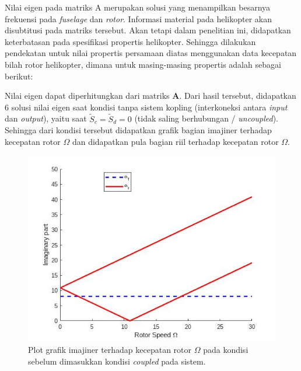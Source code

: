 Nilai eigen pada matriks A merupakan solusi yang menampilkan besarnya frekuensi pada \textit{fuselage} dan \textit{rotor}. Informasi material pada helikopter akan disubtitusi pada matriks tersebut. Akan tetapi dalam penelitian ini, didapatkan keterbatasan pada spesifikasi propertis helikopter. Sehingga dilakukan pendekatan untuk nilai propertis persamaan diatas menggunakan data kecepatan bilah rotor helikopter, dimana untuk masing-masing propertis adalah sebagai berikut:

\begin{table}[h]
	\centering
	\caption{Pendekatan nilai propertis helikopter.}
	\label{tb:propertis}
\end{table}

Nilai eigen dapat diperhitungkan dari matriks $\mathbf{A}$. Dari hasil tersebut, didapatkan 6 solusi nilai eigen saat kondisi tanpa sistem kopling (interkoneksi antara \textit{input} dan \textit{output}), yaitu saat $\tilde{S}_c = \tilde{S}_d = 0$ (tidak saling berhubungan / \textit{uncoupled}). Sehingga dari kondisi tersebut didapatkan grafik bagian imajiner terhadap kecepatan rotor $\Omega$ dan didapatkan pula bagian riil terhadap kecepatan rotor $\Omega$.

\begin{figure}[H]
	\centering
	\includegraphics[width=0.7\linewidth]{gambar/Imag(uncoupled).jpg}
	\caption{Plot grafik imajiner terhadap kecepatan rotor $\Omega$ pada kondisi sebelum dimasukkan kondisi \textit{coupled} pada sistem.}
	\label{fig:imag(uncoupled)}
\end{figure}


